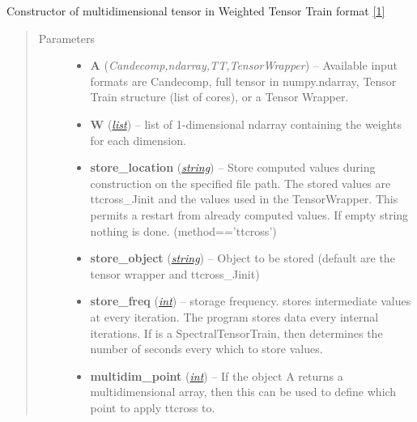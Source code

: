 \documentclass[a4paper,10pt,english]{sphinxmanual}
\begin{document}
\begin{fulllineitems}
\label{api-wttvec:TensorToolbox.core.WTTvec}
Constructor of multidimensional tensor in Weighted Tensor Train format {\hyperref[zrefs:oseledets2011]{{[}1{]}}}
\begin{quote}\begin{description}
\item[{Parameters}] \leavevmode\begin{itemize}
\item {} 
\textbf{A} (\emph{Candecomp,ndarray,TT,TensorWrapper}) -- Available input formats are Candecomp, full tensor in numpy.ndarray, Tensor Train structure (list of cores), or a Tensor Wrapper.

\item {} 
\textbf{W} (\href{http://docs.python.org/library/functions.html\#list}{\emph{list}}) -- list of 1-dimensional ndarray containing the weights for each dimension.

\item {} 
\textbf{store\_location} (\href{http://docs.python.org/library/string.html\#module-string}{\emph{string}}) -- Store computed values during construction on the specified file path. The stored values are ttcross\_Jinit and the values used in the TensorWrapper. This permits a restart from already computed values. If empty string nothing is done. (method=='ttcross')

\item {} 
\textbf{store\_object} (\href{http://docs.python.org/library/string.html\#module-string}{\emph{string}}) -- Object to be stored (default are the tensor wrapper and ttcross\_Jinit)

\item {} 
\textbf{store\_freq} (\href{http://docs.python.org/library/functions.html\#int}{\emph{int}}) -- storage frequency.  stores intermediate values at every iteration. The program stores data every  internal iterations. If  is a SpectralTensorTrain, then  determines the number of seconds every which to store values.

\item {} 
\textbf{multidim\_point} (\href{http://docs.python.org/library/functions.html\#int}{\emph{int}}) -- If the object A returns a multidimensional array, then this can be used to define which point to apply ttcross to.


\end{itemize}
\end{description}
\end{quote}
\end{fulllineitems}
\end{document}
